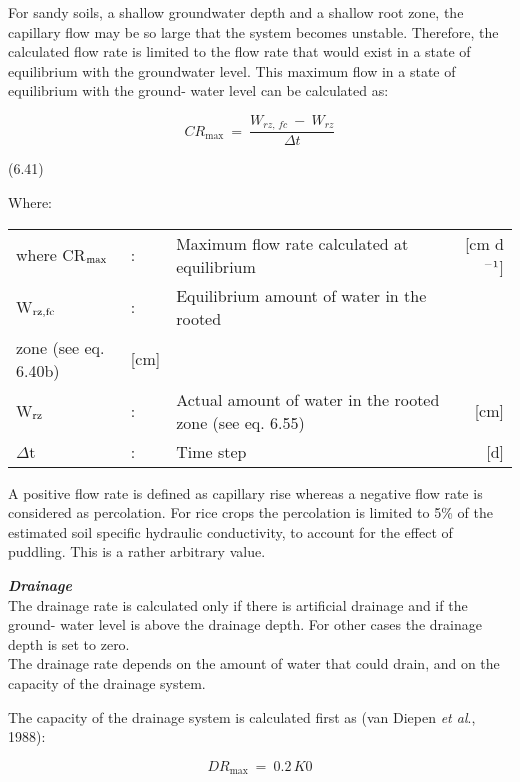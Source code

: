 For sandy soils, a shallow groundwater depth and a shallow root zone, the capillary flow
may be so large that the system becomes unstable. Therefore, the calculated flow rate is
limited to the flow rate that would exist in a state of equilibrium with the groundwater
level. This maximum flow in a state of equilibrium with the ground- water level can be
calculated as:

\begin{equation}
CR _{\max } ~=~{\frac{ W _{rz,\, fc} ~-~ W _{rz} }{\Delta t}}
\end{equation}

 
\strut\hfill (6.41)

Where:\\
\begin{tabularx}{\textwidth}{llXr}



where CR$_{{\rm max}}$ &:& Maximum flow rate calculated at equilibrium  & [cm d$^{{\rm -1}}$]\\
W$_{{\rm rz,fc}}$ &:& Equilibrium amount of water in the rooted\\
   zone (see eq. 6.40b)  & [cm]\\
W$_{{\rm rz}}$ &:& Actual amount of water in the rooted zone (see eq. 6.55)  & [cm]\\
$\Delta$t &:& Time step  & [d]

\end{tabularx}

A positive flow rate is defined as capillary rise whereas a negative flow rate is considered
as percola\-tion. For rice crops the percolation is limited to 5\% of the estimated soil
specific hydraulic conductiv\-ity, to account for the effect of puddling. This is a rather
arbitrary value.

 

{\bf {\it Drainage\/}}\\
The drainage rate is calculated only if there is artificial drainage and if the ground- water
level is above the drainage depth. For other cases the drainage depth is set to zero.\\
The drainage rate depends on the amount of water that could drain, and on the capacity of
the drainage system.

The capacity of the drainage system is calculated first as (van Diepen {\it et al\/}., 1988):

\begin{equation}
DR _{\max } ~=~ 0.2\, K0
\end{equation}

